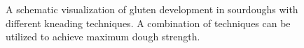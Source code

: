 \documentclass[paper=a4, twoside=false, fontsize=12pt, parskip=half,
                bibliography=totoc, listof=totoc]{scrbook}
\begin{document}
\begin{figure}[!htb]
  \centering
  
  \caption[Dough strength over time with kneading]{A schematic visualization
      of gluten development in sourdoughs with different kneading techniques.
      A combination of techniques can be utilized to achieve maximum dough
      strength.}%
  \label{fig:dough-strength-sourdough}
\end{figure}
\end{document}
